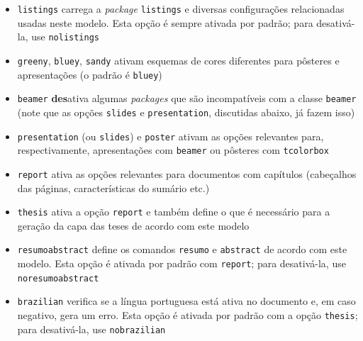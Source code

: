 \begin{itemize}
  \item \texttt{listings} carrega a \textit{package} \texttt{listings} e diversas
        configurações relacionadas usadas neste modelo. Esta opção é
        sempre ativada por padrão; para desativá-la, use \texttt{nolistings}

  \item \texttt{greeny}, \texttt{bluey}, \texttt{sandy} ativam esquemas de cores
        diferentes para pôsteres e apresentações (o padrão é \texttt{bluey})

  \item \texttt{beamer} \textbf{des}ativa algumas \textit{packages} que
        são incompatíveis com a classe \texttt{beamer} (note que as opções
        \texttt{slides} e \texttt{presentation}, discutidas abaixo, já fazem isso)

  \item \texttt{presentation} (ou \texttt{slides}) e \texttt{poster} ativam as
        opções relevantes para, respectivamente, apresentações com
        \texttt{beamer} ou pôsteres com \texttt{tcolorbox}

  \item \texttt{report} ativa as opções relevantes para documentos com
        capítulos (cabeçalhos das páginas, características do sumário etc.)

  \item \texttt{thesis} ativa a opção \texttt{report} e também define o que é
        necessário para a geração da capa das teses de acordo com este modelo

  \item \texttt{resumoabstract} define os comandos \texttt{resumo} e \texttt{abstract}
        de acordo com este modelo. Esta opção é ativada por padrão com
        \texttt{report}; para desativá-la, use \texttt{noresumoabstract}

  \item \texttt{brazilian} verifica se a língua portuguesa está ativa no
        documento e, em caso negativo, gera um erro. Esta opção é
        ativada por padrão com a opção \texttt{thesis}; para desativá-la,
        use \texttt{nobrazilian}
\end{itemize}

